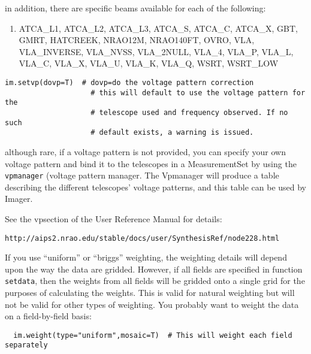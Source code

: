 in addition, there are specific beams available for each of the following:

\begin{enumerate}
   \item ATCA\_L1, ATCA\_L2, ATCA\_L3, ATCA\_S, ATCA\_C, ATCA\_X, GBT, GMRT,
   HATCREEK, NRAO12M, NRAO140FT, OVRO, VLA, VLA\_INVERSE, VLA\_NVSS,
   VLA\_2NULL, VLA\_4, VLA\_P, VLA\_L, VLA\_C, VLA\_X, VLA\_U, VLA\_K, VLA\_Q,
   WSRT, WSRT\_LOW 
\end{enumerate}

\small
\begin{verbatim}
im.setvp(dovp=T)  # dovp=do the voltage pattern correction
                    # this will default to use the voltage pattern for the
                    # telescope used and frequency observed. If no such
                    # default exists, a warning is issued.
\end{verbatim}
\normalsize

although rare, if a voltage pattern is not provided, you can specify
your own voltage pattern and bind it to the telescopes in a
MeasurementSet by using the {\tt vpmanager} (voltage pattern
manager. The Vpmanager will produce a table describing the different
telescopes' voltage patterns, and this table can be used by Imager.
 
See the vpsection of the User Reference Manual for details: 
\small
\begin{verbatim}
http://aips2.nrao.edu/stable/docs/user/SynthesisRef/node228.html
\end{verbatim}
\normalsize


\vspace{3mm}

If you use ``uniform'' or ``briggs'' weighting, the weighting details
will depend upon the way the data are gridded.  However, if all fields
are specified in function {\tt setdata}, then the weights from all
fields will be gridded onto a single grid for the purposes of
calculating the weights.  This is valid for natural weighting but will
not be valid for other types of weighting.  You probably want to
weight the data on a field-by-field basis:


\small
\begin{verbatim}
  im.weight(type="uniform",mosaic=T)  # This will weight each field separately
\end{verbatim}
\normalsize

\vspace{3mm}

